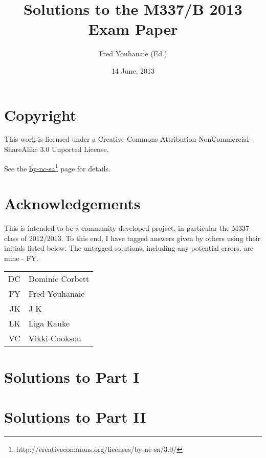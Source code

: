 \documentclass[a4paper,fleqn,12pt,twoside]{article}
\title{Solutions to the M337/B 2013 Exam Paper}
\author{Fred Youhanaie (Ed.)}
\date{14 June, 2013}
\begin{document}
\maketitle

\pagestyle{myheadings}

\section*{Copyright}

This work is licensed under a Creative Commons
Attribution-NonCommercial-ShareAlike 3.0 Unported License.

\newcommand\cclink{http://creativecommons.org/licenses/by-nc-sa/3.0/}
See the \href{\cclink}{by-nc-sa}\footnote{\cclink} page for details.

\section*{Acknowledgements}

This is intended to be a community developed project, in particular the
M337 class of 2012/2013. To this end, I have tagged answers given by
others using their initials listed below. The untagged solutions, including
any potential errors, are mine - FY.

\medskip

\begin{tabular}{r|l}
\hline
DC	& Dominic Corbett \\
FY	& Fred Youhanaie \\
JK	& J K \\
LK	& Liga Kauke \\
VC	& Vikki Cookson \\
\hline
\end{tabular}

\newpage
\section*{Solutions to Part I}

\newpage

\newpage

\newpage

\newpage

\newpage

\newpage

\newpage

\newpage

\section*{Solutions to Part II}

\newpage

\newpage

\newpage

\end{document}
